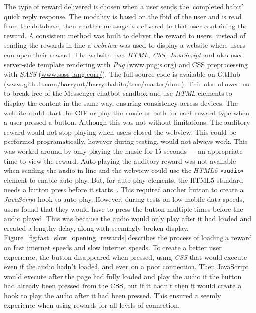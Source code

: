 The type of reward delivered is chosen when a user sends the `completed habit' quick reply response. The modality is based on the fbid of the user and is read from the database, then another message is delivered to that user containing the reward. A consistent method was built to deliver the reward to users, instead of sending the rewards in-line a \textit{webview} was used to display a website where users can open their reward. The website uses \textit{HTML}, \textit{CSS}, \textit{JavaScript} and also used server-side template rendering with \textit{Pug} (\url{www.pugjs.org}) and CSS preprocessing with \textit{SASS} (\url{www.sass-lang.com/}). The full source code is available on GitHub (\url{www.github.com/harrymt/harryshabits/tree/master/docs}). This also allowed us to break free of the Messenger chatbot sandbox and use \textit{HTML} elements to display the content in the same way, ensuring consistency across devices. The website could start the GIF or play the music or both for each reward type when a user pressed a button. Although this was not without limitations. The auditory reward would not stop playing when users closed the webview. This could be performed programatically, however during testing, would not always work. This was worked around by only playing the music for 15 seconds --- an appropriate time to view the reward. Auto-playing the auditory reward was not available when sending the audio in-line and the webview could use the \textit{HTML5} \verb|<audio>| element to enable auto-play.
But, for auto-play elements, the HTML5 standard needs a button press before it starts~\cite{mozilla_autoplay}.
This required another button to create a \textit{JavaScript} hook to auto-play.
However, during tests on low mobile data speeds, users found that they would have to press the button multiple times before the audio played.
This was because the audio would only play after it had loaded and created a lengthy delay, along with seemingly broken display.
Figure~\ref{fig:fast_slow_opening_rewards} describes the process of loading a reward on fast internet speeds and slow internet speeds. To create a better user experience, the button disappeared when pressed, using \textit{CSS} that would execute even if the audio hadn't loaded, and even on a poor connection.
Then JavaScript would execute after the page had fully loaded and play the audio if the button had already been pressed from the CSS, but if it hadn't then it would create a hook to play the audio after it had been pressed.
This ensured a seemly experience when using rewards for all levels of connection.

